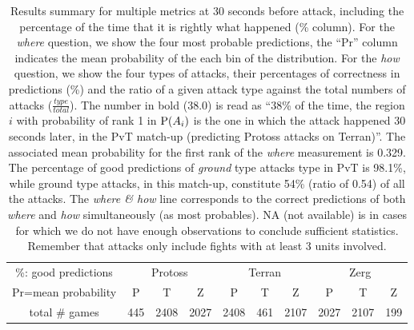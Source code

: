 \setlength{\tabcolsep}{4.69pt}
\begin{table}
\caption{Results summary for multiple metrics at 30 seconds before attack, including the percentage of the time that it is rightly what happened (\% column). For the \textit{where} question, we show the four most probable predictions, the ``Pr'' column indicates the mean probability of the each bin of the distribution. For the \textit{how} question, we show the four types of attacks, their percentages of correctness in predictions (\%) and the ratio of a given attack type against the total numbers of attacks ($\frac{type}{total}$). The number in bold (38.0) is read as ``38\% of the time, the region $i$ with probability of rank 1 in $\mathrm{P}(A_i)$ is the one in which the attack happened 30 seconds later, in the PvT match-up (predicting Protoss attacks on Terran)''. The associated mean probability for the first rank of the \textit{where} measurement is 0.329. The percentage of good predictions of \textit{ground} type attacks type in PvT is 98.1\%, while ground type attacks, in this match-up, constitute 54\% (ratio of 0.54) of all the attacks. The \textit{where \& how} line corresponds to the correct predictions of both \textit{where} and \textit{how} simultaneously (as most probables). NA (not available) is in cases for which we do not have enough observations to conclude sufficient statistics. Remember that attacks only include fights with at least 3 units involved.}
\begin{center}
\begin{small}
\begin{tabular}{|cc|cc|cc|cc|cc|cc|cc|cc|cc|cc|}
\hline
\multicolumn{2}{|c|}{\%: good predictions} & \multicolumn{6}{||c|}{Protoss} & \multicolumn{6}{|c|}{Terran} & \multicolumn{6}{|c|}{Zerg} \\
\multicolumn{2}{|c|}{Pr=mean probability} & \multicolumn{2}{||c|}{P} & \multicolumn{2}{|c|}{T} & \multicolumn{2}{|c|}{Z} & \multicolumn{2}{|c|}{P} & \multicolumn{2}{|c|}{T} & \multicolumn{2}{|c|}{Z} & \multicolumn{2}{|c|}{P} & \multicolumn{2}{|c|}{T} & \multicolumn{2}{|c|}{Z} \\
\hline
\multicolumn{2}{|c|}{total \# games} & \multicolumn{2}{|c|}{445} & \multicolumn{2}{|c|}{2408}& \multicolumn{2}{|c|}{2027}& \multicolumn{2}{|c|}{2408}& \multicolumn{2}{|c|}{461}& \multicolumn{2}{|c|}{2107}& \multicolumn{2}{|c|}{2027}& \multicolumn{2}{|c|}{2107}& \multicolumn{2}{|c|}{199}\\


\end{tabular}
\end{small}
\end{center}
\end{table}
